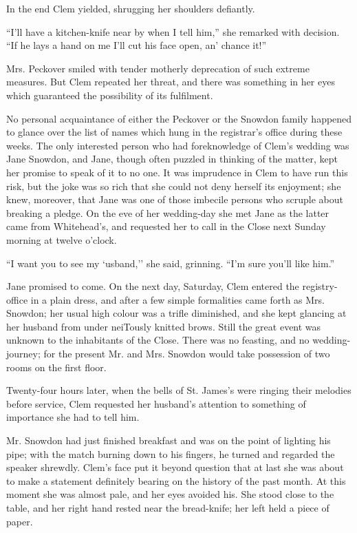 In the end Clem yielded, shrugging her shoulders defiantly.

``I'll have a kitchen-knife near by when I tell him,'' she remarked with
decision. ``If he lays a hand on me I'll cut his face open, an' chance
it!''

Mrs. Peckover smiled with tender motherly deprecation of such extreme
measures. But Clem repeated her threat, and there was something in her
eyes which guaranteed the possibility of its fulfilment.

No personal acquaintance of either the {}Peckover or the Snowdon family
happened to glance over the list of names which hung in the registrar's
office during these weeks. The only interested person who had
foreknowledge of Clem's wedding was Jane Snowdon, and Jane, though often
puzzled in thinking of the matter, kept her promise to speak of it to no
one. It was imprudence in Clem to have run this risk, but the joke was
so rich that she could not deny herself its enjoyment; she knew,
moreover, that Jane was one of those imbecile persons who scruple about
breaking a pledge. On the eve of her wedding-day she met Jane as the
latter came from Whitehead's, and requested her to call in the Close
next Sunday morning at twelve o'clock.

``I want you to see my `usband,'' she said, grinning. ``I'm sure you'll
like him.''

Jane promised to come. On the next day, Saturday, Clem entered the
registry-office in a plain dress, and after a few simple formalities
came forth as Mrs. Snowdon; her usual high colour was a trifle
diminished, and she {}kept glancing at her husband from under neiTously
knitted brows. Still the great event was unknown to the inhabitants of
the Close. There was no feasting, and no wedding-journey; for the
present Mr. and Mrs. Snowdon would take possession of two rooms on the
first floor.

Twenty-four hours later, when the bells of St. James's were ringing
their melodies before service, Clem requested her husband's attention to
something of importance she had to tell him.

Mr. Snowdon had just finished breakfast and was on the point of lighting
his pipe; with the match burning down to his fingers, he turned and
regarded the speaker shrewdly. Clem's face put it beyond question that
at last she was about to make a statement definitely bearing on the
history of the past month. At this moment she was almost pale, and her
eyes avoided his. She stood close to the table, and her right hand
rested near the bread-knife; her left held a piece of paper.

